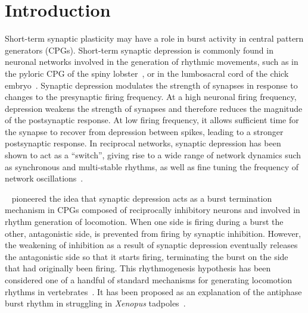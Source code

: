 \section{Introduction}
Short-term synaptic plasticity may have a role in burst activity in central pattern
generators (CPGs).
Short-term synaptic depression is commonly found in neuronal networks involved in the generation of rhythmic movements, such as in the pyloric CPG of the spiny lobster~\citep{manor1997, rabbah2007}, or in the lumbosacral cord of the chick embryo~\citep{donovan1998}.
Synaptic depression modulates the strength of synapses in response to changes to the presynaptic firing frequency.
At a high neuronal firing frequency, depression weakens the strength of synapses and therefore reduces the magnitude of the postsynaptic response.
At low firing frequency, it allows sufficient time for the synapse to recover from depression between spikes, leading to a stronger postsynaptic response.
In reciprocal networks, synaptic depression has been shown to act as a ``switch'', giving rise to a wide range of network dynamics such as synchronous and multi-stable rhythms, as well as fine tuning the frequency of network oscillations~\citep{nadim2000, nadim1999, bose2011}.

~\citet{brown1911} pioneered the idea that synaptic depression acts as a burst termination
mechanism in CPGs composed of reciprocally inhibitory neurons and involved in rhythm generation of locomotion.
When one side is firing during a burst the other, antagonistic side, is prevented from
firing by synaptic inhibition.
However, the weakening of inhibition as a result of synaptic depression eventually releases the antagonistic side so that it starts firing, terminating the burst on the side that had originally been firing.
This rhythmogenesis hypothesis has been considered one of a handful of standard mechanisms for generating locomotion rhythms in vertebrates~\citep{reiss1962,perkel1974,friesen1994}.
It has been proposed as an explanation of the antiphase burst rhythm in struggling in \textit{Xenopus} tadpoles~\citep{li2007}.

